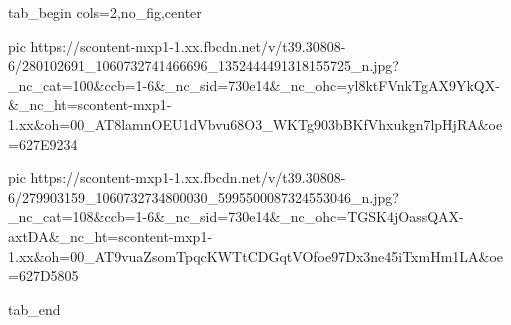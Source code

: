  
 
 
 
 


\ifcmt
  tab_begin cols=2,no_fig,center

     pic https://scontent-mxp1-1.xx.fbcdn.net/v/t39.30808-6/280102691_1060732741466696_1352444491318155725_n.jpg?_nc_cat=100&ccb=1-6&_nc_sid=730e14&_nc_ohc=yl8ktFVnkTgAX9YkQX-&_nc_ht=scontent-mxp1-1.xx&oh=00_AT8lamnOEU1dVbvu68O3_WKTg903bBKfVhxukgn7lpHjRA&oe=627E9234

     pic https://scontent-mxp1-1.xx.fbcdn.net/v/t39.30808-6/279903159_1060732734800030_5995500087324553046_n.jpg?_nc_cat=108&ccb=1-6&_nc_sid=730e14&_nc_ohc=TGSK4jOassQAX-axtDA&_nc_ht=scontent-mxp1-1.xx&oh=00_AT9vuaZsomTpqcKWTtCDGqtVOfoe97Dx3ne45iTxmHm1LA&oe=627D5805

  tab_end
\fi

